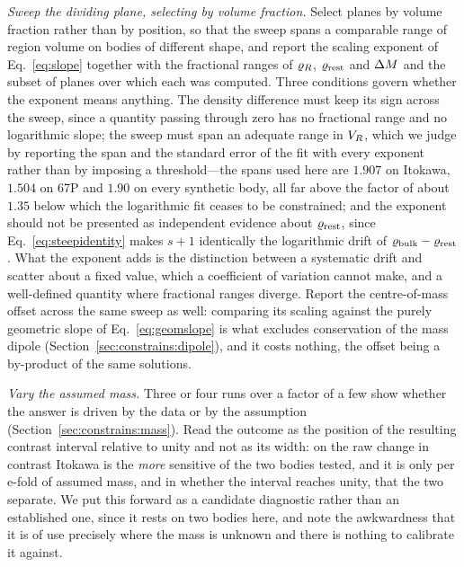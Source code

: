 \emph{Sweep the dividing plane, selecting by volume fraction.} Select planes
by volume fraction rather than by position, so that the sweep spans a
comparable range of region volume on bodies of different shape, and report
the scaling exponent of Eq.~\eqref{eq:slope} together with the fractional
ranges of $\varrho_{R}$, $\varrho_{\mathrm{rest}}$ and $\Delta M$ and the subset of planes over
which each was computed. Three conditions govern whether the exponent means
anything. The density difference must keep its sign across the sweep, since
a quantity passing through zero has no fractional range and no logarithmic
slope; the sweep must span an adequate range in $V_{R}$, which we judge by
reporting the span and the standard error of the fit with every exponent
rather than by imposing a threshold---the spans used here are $1.907$ on
Itokawa, $1.504$ on 67P and $1.90$ on every synthetic body, all far above
the factor of about $1.35$ below which the logarithmic fit ceases to be
constrained; and the exponent should not be presented as
independent evidence about $\varrho_{\mathrm{rest}}$, since Eq.~\eqref{eq:steepidentity}
makes $s+1$ identically the logarithmic drift of $\varrho_{\mathrm{bulk}}-\varrho_{\mathrm{rest}}$. What
the exponent adds is the distinction between a systematic drift and scatter
about a fixed value, which a coefficient of variation cannot make, and a
well-defined quantity where fractional ranges diverge. Report the
centre-of-mass offset across the same sweep as well: comparing its scaling
against the purely geometric slope of Eq.~\eqref{eq:geomslope} is what
excludes conservation of the mass dipole
(Section~\ref{sec:constrains:dipole}), and it costs nothing, the offset
being a by-product of the same solutions.

\emph{Vary the assumed mass.} Three or four runs over a factor of a few show
whether the answer is driven by the data or by the assumption
(Section~\ref{sec:constrains:mass}). Read the outcome as the position of the
resulting contrast interval relative to unity and not as its width: on the
raw change in contrast Itokawa is the \emph{more} sensitive of the two
bodies tested, and it is only per e-fold of assumed mass, and in whether the
interval reaches unity, that the two separate. We put this forward as a
candidate diagnostic rather than an established one, since it rests on two
bodies here, and note the awkwardness that it is of use precisely where the
mass is unknown and there is nothing to calibrate it against.

